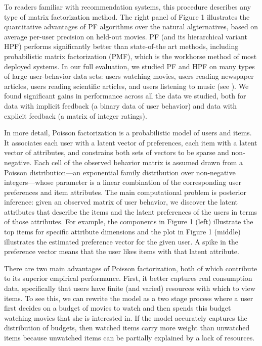 To readers familiar with recommendation systems, this procedure
describes any type of matrix factorization method.  The right panel of
Figure 1 illustrates the quantitative advantages of PF algorithms over
the natural algternatives, based on average per-user precision on
held-out movies.  PF (and its hierarchical variant HPF) performs
significantly better than state-of-the art methods, including
probabilistic matrix factorization (PMF), which is the workhorse
method of most deployed systems.  In our full evaluation, we studied
PF and HPF on many types of large user-behavior data sets: users
watching movies, users reading newspaper articles, users reading
scientific articles, and users listening to music (see ).
We found significant gains in performance across all the data we
studied, both for data with implicit feedback (a binary data of user
behavior) and data with explicit feedback (a matrix of integer
ratings).

In more detail, Poisson factorization is a probabilistic model of
users and items.  It associates each user with a latent vector of
preferences, each item with a latent vector of attributes, and
constrains both sets of vectors to be sparse and non-negative.  Each
cell of the observed behavior matrix is assumed drawn from a Poisson
distribution---an exponential family distribution over non-negative
integers---whose parameter is a linear combination of the
corresponding user preferences and item attributes.  The main
computational problem is posterior inference: given an observed matrix
of user behavior, we discover the latent attributes that describe the
items and the latent preferences of the users in terms of those
attributes.  For example, the components in Figure 1 (left) illustrate
the top items for specific attribute dimensions and the plot in Figure
1 (middle) illustrates the estimated preference vector for the given
user.  A spike in the preference vector means that the user likes
items with that latent attribute.

There are two main advantages of Poisson factorization, both of which
contribute to its superior empirical performance.  First, it better
captures real consumption data, specifically that users have finite
(and varied) resources with which to view items.  To see this, we can
rewrite the model as a two stage process where a user first decides on
a budget of movies to watch and then spends this budget watching
movies that she is interested in.  If the model accurately captures
the distribution of budgets, then watched items carry more weight than
unwatched items because unwatched items can be partially explained by
a lack of resources.

